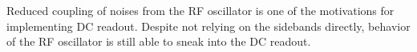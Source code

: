 \begin{figure}[]
\end{figure}


%
Reduced coupling of noises from the RF oscillator is one of the motivations
for implementing DC readout. Despite not relying on the sidebands
directly, behavior of the RF oscillator is still able to sneak into
the DC readout. 

